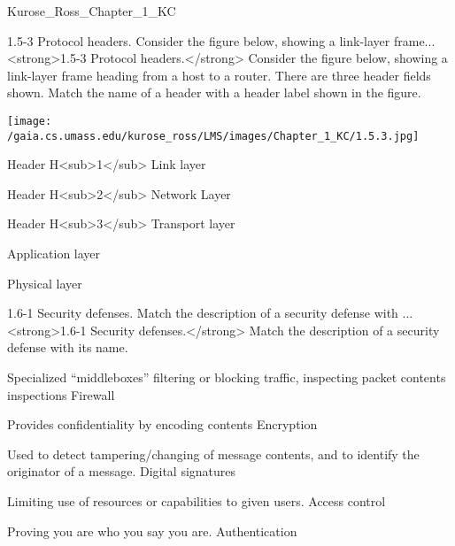 \documentclass[a4paper]{article}
\begin{document}
\begin{quiz}{Kurose_Ross_Chapter_1_KC}
\begin{matching}[
	points=1,
	penalty=0.33333,
]{1.5-3 Protocol headers. Consider the figure below, showing a link-layer frame...}
<strong>1.5-3 Protocol headers.</strong> Consider the figure below, showing a link-layer frame heading from a host to a router.  There are three header fields shown.  Match the name of a header with a header label shown in the figure. 
\begin{center}
\texttt{[image: /gaia.cs.umass.edu/kurose\_ross/LMS/images/Chapter\_1\_KC/1.5.3.jpg]}
\end{center}

\item Header H<sub>1</sub> \answer Link layer
\item Header H<sub>2</sub> \answer Network Layer
\item Header H<sub>3</sub> \answer Transport layer
\item \answer Application layer
\item \answer Physical layer
\end{matching}

\begin{matching}[
	points=1,
	penalty=0.33333,
]{1.6-1 Security defenses.  Match the description of a security defense with ...}
<strong>1.6-1 Security defenses.</strong>  Match the description of a security defense with its name.
\item Specialized “middleboxes” filtering or blocking traffic, inspecting packet contents inspections \answer Firewall
\item Provides confidentiality by encoding contents \answer Encryption
\item Used to detect tampering/changing of message contents, and to identify the originator of a message. \answer Digital signatures
\item Limiting use of resources or capabilities to given users. \answer Access control
\item Proving you are who you say you are. \answer Authentication
\end{matching}


\end{quiz}
\end{document}
